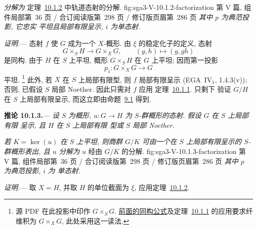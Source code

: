 
\textit{分解为}
  {定理~\hyperref[thm:sga3-V-10.1.2]{10.1.2}
   中轨道态射的分解.}
  {fig:sga3-V-10.1.2-factorization}
  {第 V 篇, 组件局部第~36 页 / 合订阅读版第~298 页 /
   修订版页眉第~286 页}
\textit{其中 \(p\) 为典范投影, 它忠实
平坦且局部有限呈示, \(i\) 为单态射.}

\medskip
\noindent\textit{证明.}---
态射 \(f\) 使 \(G\) 成为一个 \(X\)-概形. 由
\(\xi\) 的稳定化子的定义, 态射
\label{eq:sga3-V-10.1.2-stabilizer-isomorphism}%
\[
  G\times_S H\longrightarrow G\times_XG,
  \qquad (g,h)\longmapsto(g,gh)
\]
是同构. 由于 \(H\) 在 \(S\) 上平坦, 概形
\(G\times_SH\) 在 \(G\) 上平坦; 因而第一投影
\[
  p_1:G\times_XG\longrightarrow G
\]
平坦.%
\footnote{\label{source-note:sga3-V-10.1.2-fiber-product-base}源 PDF 在此投影中印作 \(G\times_SG\).
\hyperref[eq:sga3-V-10.1.2-stabilizer-isomorphism]{前面的同构公式}及定理~\hyperref[thm:sga3-V-10.1.1]{10.1.1}
的应用要求纤维积为 \(G\times_XG\), 此处采用这一读法.}
此外, 若 \(X\) 在 \(S\) 上局部有限型, 则 \(f\)
局部有限呈示 (EGA~IV\(_1\), 1.4.3(v)); 否则,
已假设 \(S\) 局部 Noether. 因此只需对 \(f\) 应用
定理~\hyperref[thm:sga3-V-10.1.1]{10.1.1}. 只剩下
验证 \(G/H\) 在 \(S\) 上局部有限呈示,
而这立即由命题~\hyperref[sga3:v:proposition:9:1]{9.1} 得到.

\medskip
{}\label{cor:sga3-V-10.1.3}%
\noindent\textbf{推论 10.1.3.}---
\textit{设 \(S\) 为概形, \(u:G\to H\) 为
\(S\)-群概形的态射. 假设 \(G\) 在 \(S\) 上局部有限
呈示, 且 \(H\) 在 \(S\) 上局部有限
型或 \(S\) 局部 Noether.}

\textit{若 \(K=\ker(u)\) 在 \(S\) 上平坦, 则商群
\(G/K\) 可由一个在 \(S\) 上局部有限呈示的
\(S\)-群概形表出, 且 \(u\) 分解为}
  {\(u\) 经由 \(G/K\) 的分解.}
  {fig:sga3-V-10.1.3-factorization}
  {第 V 篇, 组件局部第~36 页 / 合订阅读版第~298 页 /
   修订版页眉第~286 页}
\textit{其中 \(p\) 为典范投影, \(i\) 为
单态射.}

\medskip
\noindent\textit{证明.}---
取 \(X=H\), 并取 \(H\) 的单位截面为 \(\xi\),
应用定理~\hyperref[thm:sga3-V-10.1.2]{10.1.2}.


